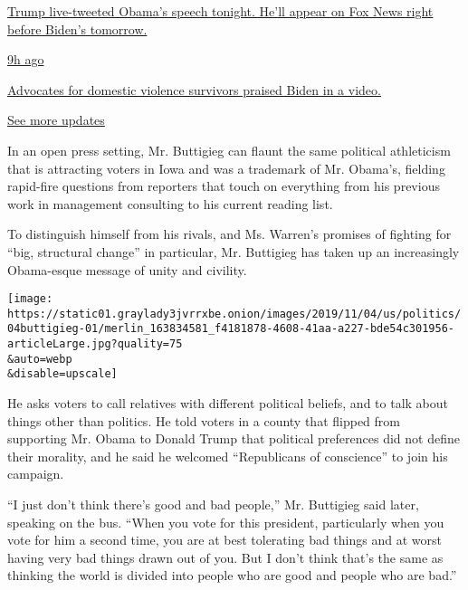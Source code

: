 \href{https://www.nytimes3xbfgragh.onion/live/2020/08/19/us/dnc-convention-election?action=click\&pgtype=Article\&state=default\&region=MAIN_CONTENT_1\&context=storylines_live_updates\#trump-live-tweeted-obamas-speech-tonight-hell-appear-on-fox-news-right-before-bidens-tomorrow}{Trump
live-tweeted Obama's speech tonight. He'll appear on Fox News right
before Biden's tomorrow.}

\href{https://www.nytimes3xbfgragh.onion/live/2020/08/19/us/dnc-convention-election?action=click\&pgtype=Article\&state=default\&region=MAIN_CONTENT_1\&context=storylines_live_updates\#advocates-for-domestic-violence-survivors-praised-biden-in-a-video}{9h
ago}

\href{https://www.nytimes3xbfgragh.onion/live/2020/08/19/us/dnc-convention-election?action=click\&pgtype=Article\&state=default\&region=MAIN_CONTENT_1\&context=storylines_live_updates\#advocates-for-domestic-violence-survivors-praised-biden-in-a-video}{Advocates
for domestic violence survivors praised Biden in a video.}

\href{https://www.nytimes3xbfgragh.onion/live/2020/08/19/us/dnc-convention-election?action=click\&pgtype=Article\&state=default\&region=MAIN_CONTENT_1\&context=storylines_live_updates}{See
more updates}

In an open press setting, Mr. Buttigieg can flaunt the same political
athleticism that is attracting voters in Iowa and was a trademark of Mr.
Obama's, fielding rapid-fire questions from reporters that touch on
everything from his previous work in management consulting to his
current reading list.

To distinguish himself from his rivals, and Ms. Warren's promises of
fighting for ``big, structural change'' in particular, Mr. Buttigieg has
taken up an increasingly Obama-esque message of unity and civility.

\texttt{[image: https://static01.graylady3jvrrxbe.onion/images/2019/11/04/us/politics/04buttigieg-01/merlin\_163834581\_f4181878-4608-41aa-a227-bde54c301956-articleLarge.jpg?quality=75\\\&auto=webp\\\&disable=upscale]}

He asks voters to call relatives with different political beliefs, and
to talk about things other than politics. He told voters in a county
that flipped from supporting Mr. Obama to Donald Trump that political
preferences did not define their morality, and he said he welcomed
``Republicans of conscience'' to join his campaign.

``I just don't think there's good and bad people,'' Mr. Buttigieg said
later, speaking on the bus. ``When you vote for this president,
particularly when you vote for him a second time, you are at best
tolerating bad things and at worst having very bad things drawn out of
you. But I don't think that's the same as thinking the world is divided
into people who are good and people who are bad.''

